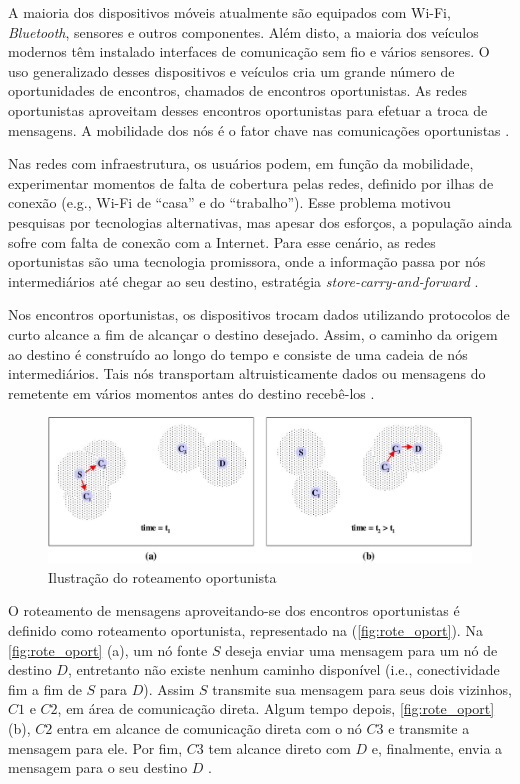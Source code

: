 \documentclass[mestrado, pre-defesa, english, brazil]{packages/icmc}
\begin{document}
A maioria dos dispositivos móveis atualmente são equipados com Wi-Fi, \textit{Bluetooth}, sensores e outros componentes. Além disto, a maioria dos veículos modernos têm instalado interfaces de comunicação sem fio e vários sensores. O uso generalizado desses dispositivos e veículos cria um grande número de oportunidades de encontros, chamados de encontros oportunistas. As redes oportunistas aproveitam desses encontros oportunistas para efetuar a troca de mensagens. A mobilidade dos nós é o fator chave nas comunicações oportunistas \cite{Khalid-2012}.

Nas redes com infraestrutura, os usuários podem, em função da mobilidade, experimentar momentos de falta de cobertura pelas redes, definido por ilhas de conexão (e.g., Wi-Fi de ``casa'' e do ``trabalho''). Esse problema motivou pesquisas por tecnologias alternativas, mas apesar dos esforços, a população ainda sofre com falta de conexão com a Internet. Para esse cenário, as redes oportunistas são uma tecnologia promissora, onde a informação passa por nós intermediários até chegar ao seu destino, estratégia \textit{store-carry-and-forward} \cite{Pond-2013}.

Nos encontros oportunistas, os dispositivos trocam dados utilizando protocolos de curto alcance a fim de alcançar o destino desejado. Assim, o caminho da origem ao destino é construído ao longo do tempo e consiste de uma cadeia de nós intermediários. Tais nós transportam altruisticamente dados ou mensagens do remetente em vários momentos antes do destino recebê-los \cite{Sastry-2011}.

\begin{figure}[!htbp]
	\centering
	\caption{\label{fig:rote_oport} Ilustração do roteamento oportunista}
	\includegraphics[width=16cm]{img/roteamento.jpeg}
\end{figure}

O roteamento de mensagens aproveitando-se dos encontros oportunistas é definido como roteamento oportunista, representado na (\autoref{fig:rote_oport}). Na \autoref{fig:rote_oport} (a), um nó fonte $S$ deseja enviar uma mensagem para um nó de destino $D$, entretanto não existe nenhum caminho disponível (i.e., conectividade fim a fim de $S$ para $D$). Assim $S$ transmite sua mensagem para seus dois vizinhos, $C1$ e $C2$, em área de comunicação direta. Algum tempo depois, \autoref{fig:rote_oport} (b), $C2$ entra em alcance de comunicação direta com o nó $C3$ e transmite a mensagem para ele. Por fim, $C3$ tem alcance direto com $D$ e, finalmente, envia a mensagem para o seu destino $D$ \cite{Vahdat-2000}.
\end{document}
